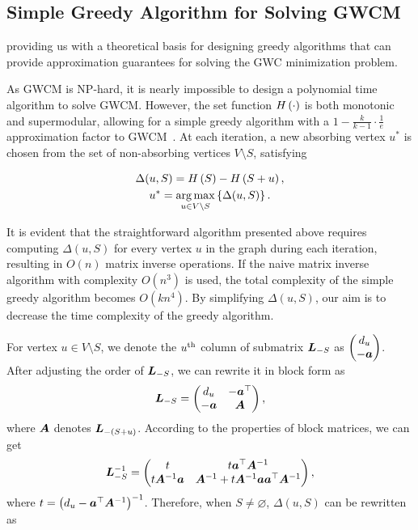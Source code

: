 \documentclass[10pt,twocolumn,twoside]{IEEEtran}
\begin{document}
\subsection{Simple Greedy Algorithm for Solving GWCM}

providing us with a theoretical basis for designing greedy algorithms that can provide approximation guarantees for solving the GWC minimization problem.

As GWCM is NP-hard, it is nearly impossible to design a polynomial time algorithm to solve GWCM.
However, the set function \(H\left(\cdot\right)\) is both monotonic and supermodular, allowing for a simple greedy algorithm with a \(1-\frac{k}{k-1}\cdot\frac{1}{e}\) approximation factor to GWCM~\cite{NeWoFi78}.
At each iteration, a new absorbing vertex \(u^*\) is chosen from the set of non-absorbing vertices \(V\setminus S\), satisfying

\begin{gather*}
    \Delta(u,S)=H\left(S\right)-H\left(S+u\right),\\
    u^*=\operatorname*{arg\,max}_{u\in V\setminus S}\left\{\Delta(u,S) \right\}.
\end{gather*}

It is evident that the straightforward algorithm presented above requires computing \(\Delta(u,S)\) for every vertex \(u\) in the graph during each iteration, resulting in \(O(n)\) matrix inverse operations.
If the naive matrix inverse algorithm with complexity \(O(n^3)\) is used, the total complexity of the simple greedy algorithm becomes \(O(kn^4)\).
By simplifying \(\Delta(u,S)\), our aim is to decrease the time complexity of the greedy algorithm.

For vertex \(u\in V\setminus S\), we denote the \({u}^{\rm{th}}\) column of submatrix \(\boldsymbol{L}_{-S}\) as \(\begin{pmatrix}d_u\\-\boldsymbol{a}\end{pmatrix}\).
After adjusting the order of \(\boldsymbol{L}_{-S}\), we can rewrite it in block form as
\begin{equation*}
    \boldsymbol{L}_{-S}=\begin{pmatrix}d_u & -\boldsymbol{a}^\top \\-\boldsymbol{a}&\boldsymbol{A}\end{pmatrix},
\end{equation*}
where \(\boldsymbol{A}\) denotes \(\boldsymbol{L}_{-(S+u)}\).
According to the properties of block matrices, we can get
\begin{equation*}
    \boldsymbol{L}_{-S}^{-1}=
    \begin{pmatrix}
        t & t\boldsymbol{a}^\top\boldsymbol{A}^{-1} \\t\boldsymbol{A}^{-1}\boldsymbol{a}&\boldsymbol{A}^{-1}+t\boldsymbol{A}^{-1}\boldsymbol{a}\boldsymbol{a}^\top\boldsymbol{A}^{-1}
    \end{pmatrix},
\end{equation*}
where \(t={\left( d_u-\boldsymbol{a}^\top{\boldsymbol{A}}^{-1} \right)}^{-1}\).
Therefore, when \(S\neq\varnothing\), \(\Delta(u,S)\) can be rewritten as
\end{document}
